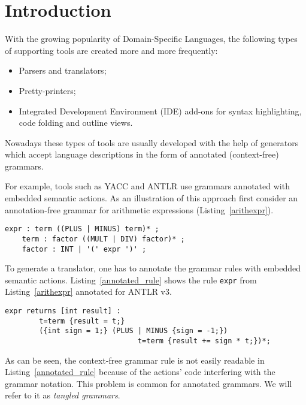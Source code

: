 \documentclass[10pt]{llncs}
\newcommand{\bad}[1]{\textcolor{red}{#1}}
\renewcommand{\bad}[1]{#1}
\newcommand{\lstref}[1]{Listing~\ref{#1}}
\newcommand{\tool}[1]{\textsc{#1}}
\begin{document}
\section{Introduction}
With the growing popularity of Domain-Specific Languages, the following types of supporting tools are created \bad{more and} more frequently:
\begin{itemize}
	\item Parsers and translators;
	\item Pretty-printers;
	\item Integrated Development Environment (IDE) add-ons for syntax highlighting, code folding and outline views.
\end{itemize}

Nowadays these types of tools are usually developed with the help of generators which accept language descriptions in the form of annotated (context-free) grammars. 

For example, tools such as \tool{YACC} \cite{YACC} and \tool{ANTLR} \cite{ANTLR} use grammars annotated with embedded semantic actions. As an illustration of this approach first consider an annotation-free grammar for arithmetic expressions (\lstref{arithexpr}).
\begin{lstlisting}[language=Grammatic,label=arithexpr,caption=Grammar for arithmetic expressions,float]
    expr : term ((PLUS | MINUS) term)* ;
    term : factor ((MULT | DIV) factor)* ;
    factor : INT | '(' expr ')' ;
\end{lstlisting}
To generate a translator, one has to annotate the grammar rules with embedded semantic actions. \lstref{annotated_rule} shows the rule \texttt{expr} from \lstref{arithexpr} annotated for \tool{ANTLR} v3.
\begin{lstlisting}[caption=Annotated grammar rule,label=annotated_rule,float]
    expr returns [int result] : 
        t=term {result = t;} 
        ({int sign = 1;} (PLUS | MINUS {sign = -1;}) 
                               t=term {result += sign * t;})*;
\end{lstlisting}

As can be seen, the context-free grammar rule is not easily readable in \lstref{annotated_rule} because of the actions' code interfering with the grammar notation. This problem is common for annotated grammars. We will refer to it as \emph{tangled grammars}.
\end{document}
